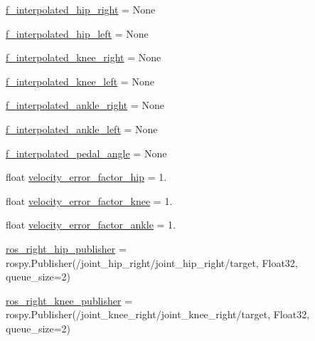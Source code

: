 \begin{DoxyCompactItemize}
\mbox{\hyperlink{namespacepedal__simulation__interpolation__lennard_a514905b8806e6950e771d1441b14e916}{f\+\_\+interpolated\+\_\+hip\+\_\+right}} = None
\item 
\mbox{\hyperlink{namespacepedal__simulation__interpolation__lennard_abe2cc20a6730cb552249b6b8c93c9200}{f\+\_\+interpolated\+\_\+hip\+\_\+left}} = None
\item 
\mbox{\hyperlink{namespacepedal__simulation__interpolation__lennard_a25823ada06679f005a4813fd7a0e5aa1}{f\+\_\+interpolated\+\_\+knee\+\_\+right}} = None
\item 
\mbox{\hyperlink{namespacepedal__simulation__interpolation__lennard_aa6fd62e75a805e24de11435ae622a825}{f\+\_\+interpolated\+\_\+knee\+\_\+left}} = None
\item 
\mbox{\hyperlink{namespacepedal__simulation__interpolation__lennard_aeca21c5de1513d9843aef387adca7162}{f\+\_\+interpolated\+\_\+ankle\+\_\+right}} = None
\item 
\mbox{\hyperlink{namespacepedal__simulation__interpolation__lennard_a2c7592ee2ffbefbf8f07b718f5652e13}{f\+\_\+interpolated\+\_\+ankle\+\_\+left}} = None
\item 
\mbox{\hyperlink{namespacepedal__simulation__interpolation__lennard_a0149951f09344add86b2532f27703a68}{f\+\_\+interpolated\+\_\+pedal\+\_\+angle}} = None
\item 
float \mbox{\hyperlink{namespacepedal__simulation__interpolation__lennard_ab2b562045985b126fd80c2eef4db855b}{velocity\+\_\+error\+\_\+factor\+\_\+hip}} = 1.
\item 
float \mbox{\hyperlink{namespacepedal__simulation__interpolation__lennard_ad80dc0226256a0f0623d781ae69844e0}{velocity\+\_\+error\+\_\+factor\+\_\+knee}} = 1.
\item 
float \mbox{\hyperlink{namespacepedal__simulation__interpolation__lennard_a77faa0597afb2fd0e9c902c74fb71101}{velocity\+\_\+error\+\_\+factor\+\_\+ankle}} = 1.
\item 
\mbox{\hyperlink{namespacepedal__simulation__interpolation__lennard_a1f86fb122869f37821b81a25640a51ec}{ros\+\_\+right\+\_\+hip\+\_\+publisher}} = rospy.\+Publisher(\textquotesingle{}/joint\+\_\+hip\+\_\+right/joint\+\_\+hip\+\_\+right/target\textquotesingle{}, Float32, queue\+\_\+size=2)
\item 
\mbox{\hyperlink{namespacepedal__simulation__interpolation__lennard_a5b234e7c1bcf1526acdf98ac26d4e208}{ros\+\_\+right\+\_\+knee\+\_\+publisher}} = rospy.\+Publisher(\textquotesingle{}/joint\+\_\+knee\+\_\+right/joint\+\_\+knee\+\_\+right/target\textquotesingle{}, Float32, queue\+\_\+size=2)

\end{DoxyCompactItemize}

